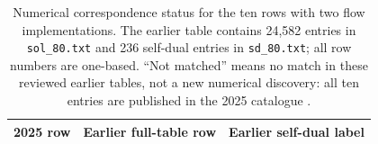 \begin{table}[htbp]
\centering\small
\begin{tabular}{@{}cp{.28\linewidth}p{.48\linewidth}@{}}
\toprule
2025 row & Earlier full-table row & Earlier self-dual label\\
\midrule
\bottomrule
\end{tabular}
\caption{Numerical correspondence status for the ten rows with two flow
implementations. The earlier table \cite{FreeData} contains 24,582
entries in \texttt{sol\_80.txt} and 236 self-dual entries in
\texttt{sd\_80.txt}; all row numbers are one-based. ``Not matched'' means
no match in these reviewed earlier tables, not a new numerical discovery:
all ten entries are published in the 2025 catalogue \cite{Data}.}
\label{tab:crosswalk}
\end{table}
